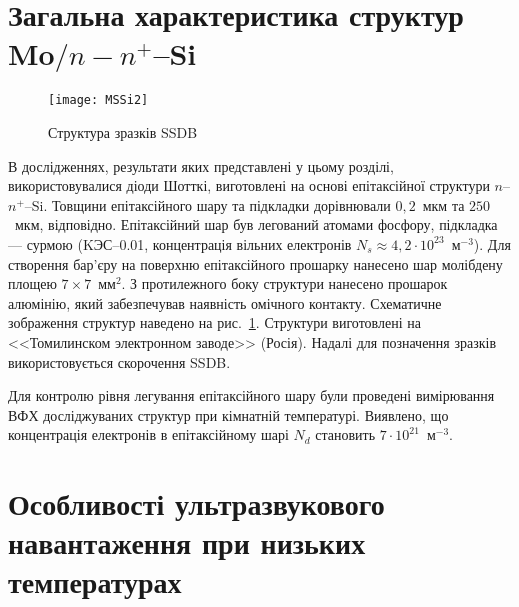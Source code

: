 \section{Загальна характеристика структур Mo$/n-n^+$--Si\label{SSDB:Struc}}



\begin{figure}[b]
\center
\texttt{[image: MSSi2]}%
\caption{\label{figMSSi2}
Структура зразків SSDB
}
\end{figure}


В дослідженнях, результати яких представлені у цьому розділі, використовувалися діоди Шотткі, виготовлені на основі епітаксійної
структури $n$--$n^+$--Si.
Товщини епітаксійного шару та підкладки дорівнювали $0,2$~мкм та $250$~мкм, відповідно.
Епітаксійний шар був легований атомами фосфору, підкладка --- сурмою
(KЭС--0.01, концентрація вільних електронів $N_s\approx4,2\cdot10^{23}$~м$^{-3}$).
Для створення бар'єру на поверхню епітаксійного прошарку нанесено шар молібдену площею $7\times7$~мм$^2$.
З протилежного боку структури нанесено прошарок алюмінію, який забезпечував наявність омічного контакту.
Схематичне зображення структур наведено на рис.~\ref{figMSSi2}.
Структури виготовлені на <<Томилинском электронном заводе>>  (Росія).
Надалі для позначення зразків використовується скорочення SSDB.

Для контролю рівня легування епітаксійного шару були проведені
вимірювання ВФХ досліджуваних структур при кімнатній температурі.
Виявлено, що концентрація електронів в епітаксійному шарі $N_d$ становить $7\cdot10^{21}$~м$^{-3}$.



\section{Особливості ультразвукового навантаження при низьких температурах\label{SSDB:USL}}

